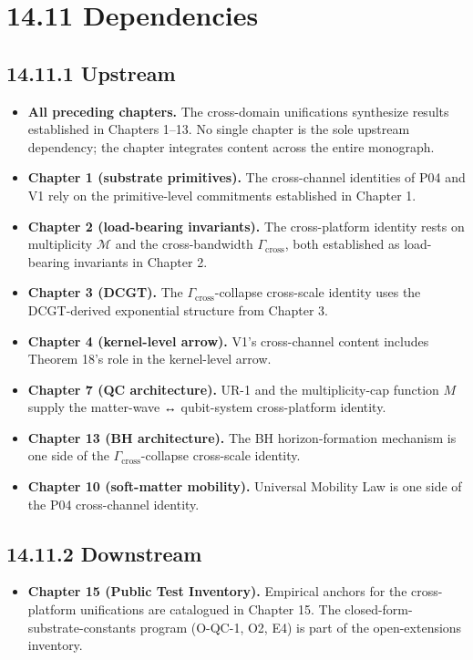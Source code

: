 \documentclass[11pt]{book}
\begin{document}
\section{14.11 Dependencies}

\subsection{14.11.1 Upstream}

\begin{itemize}
\item \textbf{All preceding chapters.} The cross-domain unifications synthesize results established in Chapters 1–13. No single chapter is the sole upstream dependency; the chapter integrates content across the entire monograph.
\item \textbf{Chapter 1 (substrate primitives).} The cross-channel identities of P04 and V1 rely on the primitive-level commitments established in Chapter 1.
\item \textbf{Chapter 2 (load-bearing invariants).} The cross-platform identity rests on multiplicity $\mathcal{M}$ and the cross-bandwidth $\Gamma_\mathrm{cross}$, both established as load-bearing invariants in Chapter 2.
\item \textbf{Chapter 3 (DCGT).} The $\Gamma_\mathrm{cross}$-collapse cross-scale identity uses the DCGT-derived exponential structure from Chapter 3.
\item \textbf{Chapter 4 (kernel-level arrow).} V1's cross-channel content includes Theorem 18's role in the kernel-level arrow.
\item \textbf{Chapter 7 (QC architecture).} UR-1 and the multiplicity-cap function $M$ supply the matter-wave ↔ qubit-system cross-platform identity.
\item \textbf{Chapter 13 (BH architecture).} The BH horizon-formation mechanism is one side of the $\Gamma_\mathrm{cross}$-collapse cross-scale identity.
\item \textbf{Chapter 10 (soft-matter mobility).} Universal Mobility Law is one side of the P04 cross-channel identity.
\end{itemize}

\subsection{14.11.2 Downstream}

\begin{itemize}
\item \textbf{Chapter 15 (Public Test Inventory).} Empirical anchors for the cross-platform unifications are catalogued in Chapter 15. The closed-form-substrate-constants program (O-QC-1, O2, E4) is part of the open-extensions inventory.
\end{itemize}
\end{document}
